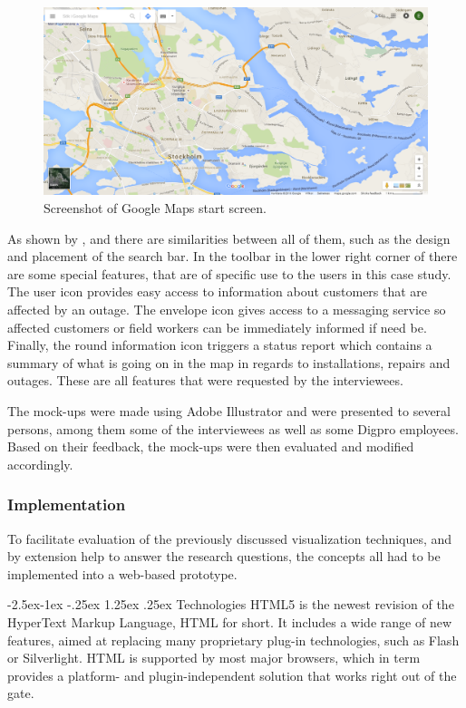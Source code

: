 \documentclass[a4paper,12pt,titlepage]{article}
\makeatletter
\newcommand\subsubsubsection{\@startsection{paragraph}{4}{\z@}%
            {-2.5ex\@plus -1ex \@minus -.25ex}%
            {1.25ex \@plus .25ex}%
            {\normalfont\normalsize\bfseries}}
\makeatother
\begin{document}
\begin{figure}[H]
    \centering
        \includegraphics[width=15cm]{googlemaps.png}
    \caption{Screenshot of Google Maps start screen.}  
    \label{fig:Googlemaps}
\end{figure}

As shown by ,  and  there are similarities between all of them, such as the design and placement of the search bar. In the toolbar in the lower right corner of  there are some special features, that are of specific use to the users in this case study. The user icon provides easy access to information about customers that are affected by an outage. The envelope icon gives access to a messaging service so affected customers or field workers can be immediately informed if need be. Finally, the round information icon triggers a status report which contains a summary of what is going on in the map in regards to installations, repairs and outages. These are all features that were requested by the interviewees.

The mock-ups were made using Adobe Illustrator and were presented to several persons, among them some of the interviewees as well as some Digpro employees. Based on their feedback, the mock-ups were then evaluated and modified accordingly. 

\subsubsection{Implementation}

To facilitate evaluation of the previously discussed visualization techniques, and by extension help to answer the research questions, the concepts all had to be implemented into a web-based prototype. 

\subsubsubsection{Technologies}
HTML5 is the newest revision of the HyperText Markup Language, HTML for short. It includes a wide range of new features, aimed at replacing many proprietary plug-in technologies, such as Flash or Silverlight. \citep{webGIS} HTML is supported by most major browsers, which in term provides a platform- and plugin-independent solution that works right out of the gate. 
\end{document}
